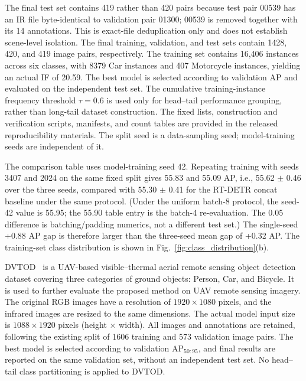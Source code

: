 \documentclass[letterpaper,journal]{IEEEtran}
\begin{document}
The final test set contains 419 rather than 420 pairs
because test pair 00539 has an IR file byte-identical to
validation pair 01300; 00539 is removed together with its
14 annotations. This is exact-file deduplication only and
does not establish scene-level isolation. The final
training, validation, and test sets contain 1428, 420, and
419 image pairs, respectively. The training set contains
16,406 instances across six classes, with 8379 Car
instances and 407 Motorcycle instances, yielding an actual
IF of 20.59. The best model is selected according to
validation AP and evaluated on the independent test set.
The cumulative training-instance frequency threshold
$\tau=0.6$ is used only for head--tail performance
grouping, rather than long-tail dataset construction. The
fixed lists, construction and verification scripts,
manifests, and count tables are provided in the released
reproducibility materials. The split seed is a
data-sampling seed; model-training seeds are independent
of it.

The comparison table uses model-training seed 42. Repeating
training with seeds 3407 and 2024 on the same fixed split
gives 55.83 and 55.09 AP, i.e., 55.62 $\pm$ 0.46 over the
three seeds, compared with 55.30 $\pm$ 0.41 for the
RT-DETR concat baseline under the same protocol. (Under the
uniform batch-8 protocol, the seed-42 value is 55.95; the
55.90 table entry is the batch-4 re-evaluation. The 0.05
difference is batching/padding numerics, not a different
test set.) The single-seed +0.88 AP gap is therefore larger
than the three-seed mean gap of +0.32 AP. The training-set
class distribution is shown in Fig.~\ref{fig:class_distribution}(b).

{DVTOD}~\cite{dvtod} is a UAV-based visible--thermal aerial remote sensing
object detection dataset covering three categories of ground
objects: Person, Car, and Bicycle. It is used to further
evaluate the proposed method on UAV remote sensing imagery.
The original RGB images have a resolution of
$1920\times1080$ pixels, and the infrared images are resized
to the same dimensions. The actual model input size is
$1088\times1920$ pixels (height $\times$ width).
All images and annotations are retained, following the
existing split of 1606 training and 573 validation image
pairs. The best model is selected according to validation
AP$_{50:95}$, and final results are reported on the same
validation set, without an independent test set.
No head--tail class partitioning is applied to DVTOD.
\end{document}
